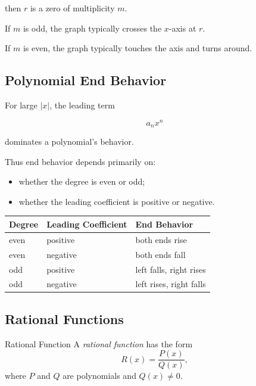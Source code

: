 then \(r\) is a zero of multiplicity \(m\).

If \(m\) is odd, the graph typically crosses the \(x\)-axis at \(r\).

If \(m\) is even, the graph typically touches the axis and turns around.

\subsection{Polynomial End Behavior}
\label{subsec:polynomial-end-behavior}

For large \(|x|\), the leading term

\[ a_nx^n \]

dominates a polynomial's behavior.

Thus end behavior depends primarily on:

\begin{itemize}
    \item whether the degree is even or odd;
    \item whether the leading coefficient is positive or negative.
\end{itemize}

\begin{center}
\begin{tabularx}{0.92\textwidth}{@{}lll@{}}
\toprule
\textbf{Degree} & \textbf{Leading Coefficient} & \textbf{End Behavior}\\
\midrule
even & positive & both ends rise\\
even & negative & both ends fall\\
odd & positive & left falls, right rises\\
odd & negative & left rises, right falls\\
\bottomrule
\end{tabularx}
\end{center}

\subsection{Rational Functions}
\label{subsec:rational-functions-analysis}

\begin{definitionbox}{Rational Function}
A \emph{rational function} has the form
\[ R(x)=\frac{P(x)}{Q(x)}, \]
where \(P\) and \(Q\) are polynomials and \(Q(x)\neq0\).
\end{definitionbox}

